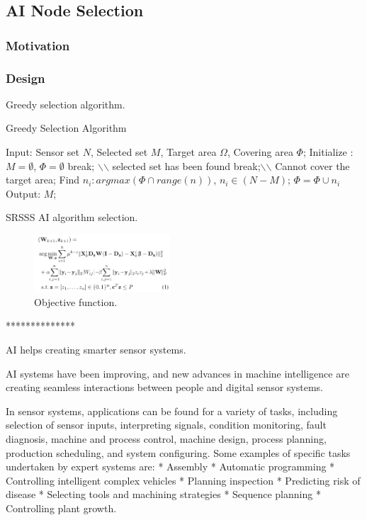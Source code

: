\subsection{AI Node Selection}

\subsubsection{Motivation}

\subsubsection{Design}

Greedy selection algorithm.

\begin{algorithm}
\caption{Greedy Selection Algorithm}
\label{Greedy}
\begin{algorithmic}[1]
\STATE Input: Sensor set $N$, Selected set $M$, Target area $\Omega$, Covering area $\Phi$;
\STATE Initialize : $M = \emptyset$, $\Phi = \emptyset$
    \IF{$\Phi = \Omega $}
        \STATE break; $\backslash$$\backslash$ selected set has been found
    \ENDIF
    	 \STATE break;$\backslash$$\backslash$ Cannot cover the target area;
    \ENDIF
    \STATE Find $n_i : argmax(\Phi \cap range(n))$, $n_i \in (N-M)$;
    \STATE $\Phi = \Phi \cup {n_i}$
\ENDWHILE
\STATE Output: $M$;
\end{algorithmic}
\end{algorithm}

SRSSS AI algorithm selection.

\begin{figure}[htbp]
	\centering
	\includegraphics[width=2in]{Figure/OF}
	\caption{Objective function.}
	\label{system}
\end{figure}


**************

AI helps creating smarter sensor systems.

AI systems have been improving, and new advances in machine intelligence are creating seamless interactions between people and digital sensor systems.

 In sensor systems, applications can be found for a variety of tasks, including selection of sensor inputs, interpreting signals, condition monitoring, fault diagnosis, machine and process control, machine design, process planning, production scheduling, and system configuring. Some examples of specific tasks undertaken by expert systems are:
* Assembly 
* Automatic programming 
* Controlling intelligent complex vehicles  
* Planning inspection 
* Predicting risk of disease 
* Selecting tools and machining strategies 
* Sequence planning 
* Controlling plant growth. 

